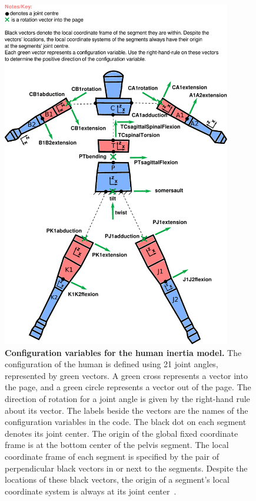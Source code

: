 \documentclass[10pt]{article}
\begin{document}
\begin{figure}[!ht]
  \begin{center}
    \includegraphics[height=6in]{figfactory/configuration.pdf}
  \end{center}
  \caption{
    {\bf Configuration variables for the human inertia model.}  The
    configuration of the human is defined using 21 joint angles, represented by
    green vectors. A green cross represents a vector into the page, and a green
    circle represents a vector out of the page. The direction of rotation for a
    joint angle is given by the right-hand rule about its vector. The labels
    beside the vectors are the names of the configuration variables in the
    code. The black dot on each segment denotes its joint center. The origin
    of the global fixed coordinate frame is at the bottom center of the pelvis
    segment. The local coordinate frame of each segment is specified by the
    pair of perpendicular black vectors in or next to the segments. Despite the
    locations of these black vectors, the origin of a segment's local
    coordinate system is always at its joint center~\cite{Yeadon1990e}.
  }
  \label{fig:config}
\end{figure}
\end{document}
